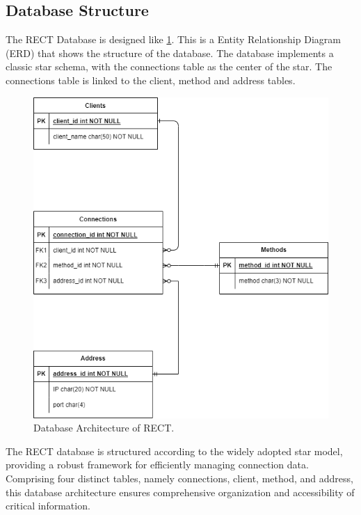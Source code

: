 \subsection{Database Structure}

The RECT Database is designed like \ref{fig:db-architecture}. This is a Entity Relationship Diagram (ERD) that shows the structure of the database. The database implements a
classic star schema, with the connections table as the center of the star. The connections table is linked to the client, method and address tables.

\begin{figure}
	\centering

	\includegraphics[width=\textwidth]{img/RECT-erd}

	\caption{Database Architecture of RECT.}
	\label{fig:db-architecture}
\end{figure}



The RECT database is structured according to the widely adopted star model, providing a robust framework for efficiently managing connection data. Comprising four distinct 
tables, namely connections, client, method, and address, this database architecture ensures comprehensive organization and accessibility of critical information.\newline

